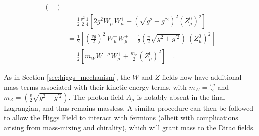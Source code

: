 \begin{equation}
\begin{split}
\begin{pmatrix}
            \end{pmatrix} \\
        & = \frac{1}{2} \frac{v^2}{2} \frac{1}{4} 
            \left[ 2 g^2  W^-_{\mu} W^+_{\mu}
            + \left(\sqrt{g^2 + g^{\prime 2}}\right)^2 (Z^0_{\mu})^2 \right] \\
        & = \frac{1}{2} \left[ \left(\frac{vg}{2}\right)^2\  W^-_{\mu} W^+_{\mu}
            + \frac{1}{2} \left(\frac{v}{2}\sqrt{g^2 + g^{\prime 2}}\right)\ (Z^0_{\mu})^2 \right] \\
        & = \frac{1}{2} \left[ m_W W^{-\ \mu} W^+_{\mu} + \frac{m_Z}{2} (Z^0_{\mu})^2 \right]
        \quad.
    \end{split} \end{equation}

    As in Section \ref{sec:higgs_mechanism}, the $W$ and $Z$ fields now have additional mass terms associated with their kinetic energy terms,
        with $m_W = \frac{vg}{2}$ and $m_Z = \left(\frac{v}{2}\sqrt{g^2 + g^{\prime 2}}\right) $.
    The photon field $A_{\mu}$ is notably absent in the final Lagrangian, and thus remains massless.
    A similar procedure can then be followed to allow the Higgs Field to interact with fermions
        (albeit with complications arising from mass-mixing and chirality),
        which will grant mass to the Dirac fields.




